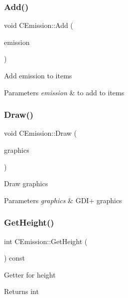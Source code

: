 \subsubsection{\texorpdfstring{Add()}{Add()}}
{\footnotesize\ttfamily void C\+Emission\+::\+Add (\begin{DoxyParamCaption}\item[{std\+::shared\+\_\+ptr$<$ \mbox{\hyperlink{class_c_emission}{C\+Emission}} $>$}]{emission }\end{DoxyParamCaption})}

Add emission to items 
\begin{DoxyParams}{Parameters}
{\em emission} & to add to items \\
\hline
\end{DoxyParams}
\mbox{\label{class_c_emission_aad1f5c4fdc7c7ba286f17dd1cd43062d}} 
\subsubsection{\texorpdfstring{Draw()}{Draw()}}
{\footnotesize\ttfamily void C\+Emission\+::\+Draw (\begin{DoxyParamCaption}\item[{Gdiplus\+::\+Graphics $\ast$}]{graphics }\end{DoxyParamCaption})\hspace{0.3cm}{\ttfamily [virtual]}}

Draw graphics 
\begin{DoxyParams}{Parameters}
{\em graphics} & G\+D\+I+ graphics \\
\hline
\end{DoxyParams}
\mbox{\label{class_c_emission_af7f9f8206ef015c9ba50684f6ae1246b}} 
\subsubsection{\texorpdfstring{GetHeight()}{GetHeight()}}
{\footnotesize\ttfamily int C\+Emission\+::\+Get\+Height (\begin{DoxyParamCaption}{ }\end{DoxyParamCaption}) const\hspace{0.3cm}{\ttfamily [inline]}}

Getter for height \begin{DoxyReturn}{Returns}
int 
\end{DoxyReturn}
\mbox{\label{class_c_emission_a0a072a7fe378f16f9daed81dc875d722}} 
